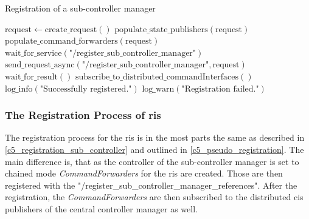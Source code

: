 \begin{algorithm}
	\caption{Registration of a sub-controller manager}
\begin{algorithmic}[1]
  \State $\text{request} \gets \text{create\_request}()$
  \State $\text{populate\_state\_publishers}(\text{request})$
  \State $\text{populate\_command\_forwarders}(\text{request})$
  \State $\text{wait\_for\_service}(\text{"/register\_sub\_controller\_manager"})$
  \State $\text{send\_request\_async}(\text{"/register\_sub\_controller\_manager"}, \text{request})$
  \State $\text{wait\_for\_result}()$
    \State $\text{subscribe\_to\_distributed\_commandInterfaces}()$
    \State $\text{log\_info}(\text{"Successfully registered."})$
  \Else
    \State $\text{log\_warn}(\text{"Registration failed."})$
  \EndIf
\EndProcedure
\end{algorithmic}\label{c5_pseudo_registration}
\end{algorithm}

\subsubsection{The Registration Process of \Glspl{ri}}
The registration process for the \glspl{ri} is in the most parts the same as described in \autoref{c5_registration_sub_controller} and outlined in \autoref{c5_pseudo_registration}. The main difference is, that as the controller of the sub-controller manager is set to chained mode \textit{CommandForwarders} for the \glspl{ri} are created. Those are then registered with the "/register\_sub\_controller\_manager\_references". After the registration, the \textit{CommandForwarders} are then subscribed to the distributed \glspl{ci} publishers of the central controller manager as well.

